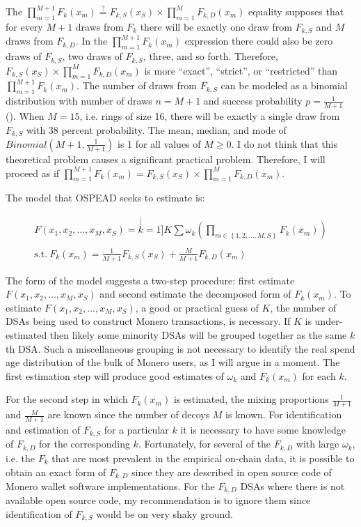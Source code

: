 \documentclass[english]{article}
\begin{document}
The $\prod_{m=1}^{M+1}F_{k}(x_{m})\overset{?}{=}F_{k,S}(x_{S})\times\prod_{m=1}^{M}F_{k,D}(x_{m})$
equality supposes that for every $M+1$ draws from $F_{k}$ there
will be exactly one draw from $F_{k,S}$ and $M$ draws from $F_{k,D}$.
In the $\prod_{m=1}^{M+1}F_{k}(x_{m})$ expression there could also
be zero draws of $F_{k,S}$, two draws of $F_{k,S}$, three, and so
forth. Therefore, $F_{k,S}(x_{S})\times\prod_{m=1}^{M}F_{k,D}(x_{m})$
is more ``exact'', ``strict'', or ``restricted'' than $\prod_{m=1}^{M+1}F_{k}(x_{m})$.
The number of draws from $F_{k,S}$ can be modeled as a binomial distribution
with number of draws $n=M+1$ and success probability $p=\frac{1}{M+1}$
(\cite{McLachlan2019}). When $M=15$, i.e. rings of size 16, there
will be exactly a single draw from $F_{k,S}$ with 38 percent probability.
The mean, median, and mode of $Binomial(M+1,\frac{1}{M+1})$ is 1
for all values of $M\geq0$. I do not think that this theoretical
problem causes a significant practical problem. Therefore, I will
proceed as if $\prod_{m=1}^{M+1}F_{k}(x_{m})=F_{k,S}(x_{S})\times\prod_{m=1}^{M}F_{k,D}(x_{m})$.

The model that OSPEAD seeks to estimate is:

\begin{equation}
\begin{array}{c}
F(x_{1},x_{2},\ldots,x_{M},x_{S})=\stackrel[k=1]{K}{\sum}\omega_{k}\left(\underset{m\in\left\{ 1,2,\ldots,M,S\right\} }{\prod}F_{k}(x_{m})\right)\\
\\
\mathrm{s.t.}\:F_{k}(x_{m})=\frac{1}{M+1}F_{k,S}(x_{S})+\frac{M}{M+1}F_{k,D}(x_{m})
\end{array}\label{eq:OSPEAD-complete-real-spend-model}
\end{equation}

The form of the model suggests a two-step procedure: first estimate
$F(x_{1},x_{2},\ldots,x_{M},x_{S})$ and second estimate the decomposed
form of $F_{k}(x_{m})$. To estimate $F(x_{1},x_{2},\ldots,x_{M},x_{S})$,
a good or practical guess of $K$, the number of DSAs being used to
construct Monero transactions, is necessary. If $K$ is under-estimated
then likely some minority DSAs will be grouped together as the same
$k$th DSA. Such a miscellaneous grouping is not necessary to identify
the real spend age distribution of the bulk of Monero users, as I
will argue in a moment. The first estimation step will produce good
estimates of $\omega_{k}$ and $F_{k}(x_{m})$ for each $k$.

For the second step in which $F_{k}(x_{m})$ is estimated, the mixing
proportions $\frac{1}{M+1}$and $\frac{M}{M+1}$ are known since the
number of decoys $M$ is known. For identification and estimation
of $F_{k,S}$ for a particular $k$ it is necessary to have some knowledge
of $F_{k,D}$ for the corresponding $k$. Fortunately, for several
of the $F_{k,D}$ with large $\omega_{k}$, i.e. the $F_{k}$ that
are most prevalent in the empirical on-chain data, it is possible
to obtain an exact form of $F_{k,D}$ since they are described in
open source code of Monero wallet software implementations. For the
$F_{k,D}$ DSAs where there is not available open source code, my
recommendation is to ignore them since identification of $F_{k,S}$
would be on very shaky ground.
\end{document}
